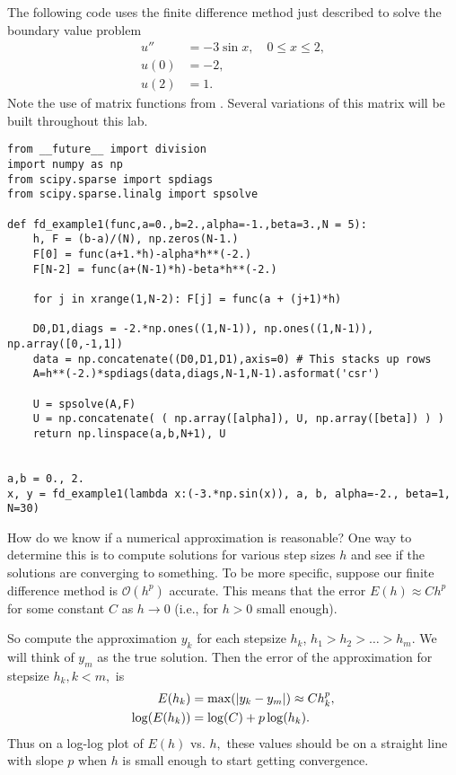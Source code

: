 The following code uses the finite difference method just described to solve the boundary value problem
\begin{align*}
u'' &= -3 \sin{x}, \quad 0 \leq x \leq 2,\\
	u(0) &= -2,\\
	u(2) &= 1.
\end{align*}
Note the use of matrix functions from . Several variations of this matrix will be built throughout this lab. 

\begin{lstlisting}
from __future__ import division
import numpy as np
from scipy.sparse import spdiags
from scipy.sparse.linalg import spsolve

def fd_example1(func,a=0.,b=2.,alpha=-1.,beta=3.,N = 5):
	h, F = (b-a)/(N), np.zeros(N-1.)
	F[0] = func(a+1.*h)-alpha*h**(-2.)
	F[N-2] = func(a+(N-1)*h)-beta*h**(-2.)
	
	for j in xrange(1,N-2): F[j] = func(a + (j+1)*h)
	
	D0,D1,diags = -2.*np.ones((1,N-1)), np.ones((1,N-1)), np.array([0,-1,1])
	data = np.concatenate((D0,D1,D1),axis=0) # This stacks up rows
	A=h**(-2.)*spdiags(data,diags,N-1,N-1).asformat('csr')
	
	U = spsolve(A,F)
	U = np.concatenate( ( np.array([alpha]), U, np.array([beta]) ) )
	return np.linspace(a,b,N+1), U


a,b = 0., 2.
x, y = fd_example1(lambda x:(-3.*np.sin(x)), a, b, alpha=-2., beta=1, N=30)
\end{lstlisting}

How do we know if a numerical approximation is reasonable? One way to determine this 
is to compute solutions for various step sizes $h$ and see if the solutions are 
converging to something. To be more specific, suppose our finite difference method 
is $\mathcal{O}(h^p)$ accurate. This means that the error $E(h) \approx Ch^p$ for some constant $C$ as $h \to 0$ (i.e., for $h>0$ small enough).

So compute the approximation $y_k$ for each stepsize $h_k$, $h_1 > h_2> \ldots>h_m.$ 
We will think of $y_m$ as the true solution. Then the error of the approximation for 
stepsize $h_k, k < m,$ is 
\begin{align*}
	E(h_k) &= \max( \left\lvert y_k - y_m\right\rvert) \approx C h_k^p ,\\
	\log(E(h_k)) &= \log(C) + p \log(h_k).
\end{align*}
Thus on a log-log plot of $E(h)$ vs. $h,$ these values should be on a straight line with slope $p$ when $h$ is small enough to start getting convergence. 

